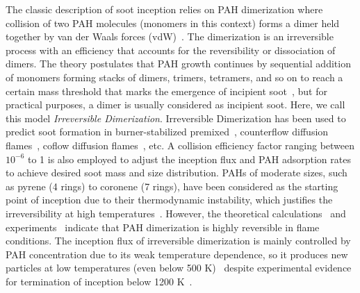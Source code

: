 
The classic description of soot inception relies on PAH dimerization where collision of two PAH molecules (monomers in this context) forms a dimer held together by van der Waals forces (vdW)~\citep{frenklach1991detailed}. The dimerization is an irreversible process with an efficiency that accounts for the reversibility or dissociation of dimers. The theory postulates that PAH growth continues by sequential addition of monomers forming stacks of dimers, trimers, tetramers, and so on to reach a certain mass threshold that marks the emergence of incipient soot~\citep{frenklach1991detailed}, but for practical purposes, a dimer is usually considered as incipient soot. Here, we call this model \textit{Irreversible Dimerization}. 
Irreversible Dimerization has been used to predict soot formation in burner-stabilized premixed~\citep{salenbauch2015modeling, desgroux2017comparative}, counterflow diffusion flames~\citep{wang2015soot, xu2021experimental}, coflow diffusion flames~\citep{kholghy2016core, veshkini2016understanding}, etc. A collision efficiency factor ranging between $10^{-6}$ to 1 is also employed to adjust the inception flux and PAH adsorption rates to achieve desired soot mass and size distribution. PAHs of moderate sizes, such as pyrene (4 rings) to coronene (7 rings), have been considered as the starting point of inception due to their thermodynamic instability, which justifies the irreversibility at high temperatures~\citep{frenklach1991detailed}. However, the theoretical calculations~\citep{miller1985calculations} and experiments~\citep{sabbah2010exploring} indicate that PAH dimerization is highly reversible in flame conditions. The inception flux of irreversible dimerization is mainly controlled by PAH concentration due to its weak temperature dependence, so it produces new particles at low temperatures (even below 500 K)~\citep{naseri2022simulating} despite experimental evidence for termination of inception below 1200 K~\citep{sanchez2012polycyclic, cho2016synthesis}. 

